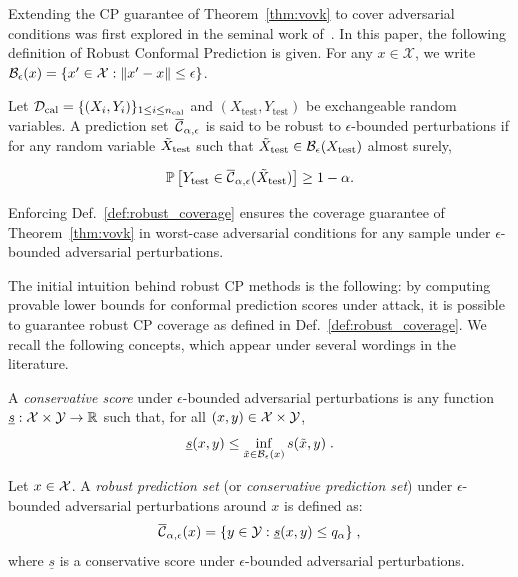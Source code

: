 Extending the CP guarantee of Theorem~\ref{thm:vovk} to cover adversarial conditions was first explored in the seminal work of~\citet{rscp}. In this paper, the following definition of Robust Conformal Prediction is given. For any $x \in \mathcal{X}$, we write $\mathcal{B}_\epsilon(x)=\{x' \in \mathcal{X}: \Vert x'-x \Vert \leq \epsilon\}$.


\begin{definition}
    Let $\mathcal{D}_\mathrm{cal} = \{ (X_i,Y_i) \}_{1 \leq i \leq n_\mathrm{cal}}$ and $(X_\mathrm{test},Y_\mathrm{test})$ be exchangeable random variables. A prediction set~$\overline{\mathcal{C}}_{\alpha, \epsilon}$ is said to be robust to $\epsilon$-bounded perturbations if for any random variable $\Tilde{X}_\mathrm{test}$ such that $\Tilde{X}_\mathrm{test} \in \mathcal{B}_\epsilon(X_\mathrm{test})$ almost surely,

    \begin{equation}
        \mathbb{P} \left[Y_\mathrm{test} \in \overline{\mathcal{C}}_{\alpha, \epsilon}(\Tilde{X}_\mathrm{test}) \right] \geq 1 - \alpha.
    \end{equation}
\label{def:robust_coverage}
\end{definition}


Enforcing Def.~\ref{def:robust_coverage} ensures the coverage guarantee of Theorem~\ref{thm:vovk} in worst-case adversarial conditions for any sample under $\epsilon$-bounded adversarial perturbations. 

The initial intuition behind robust CP methods is the following: by computing provable lower bounds for conformal prediction scores under attack, it is possible to guarantee robust CP coverage as defined in Def.~\ref{def:robust_coverage}. We recall the following concepts, which appear under several wordings in the literature.

\begin{definition}
    A \emph{conservative score} under $\epsilon$-bounded adversarial perturbations is any function $\underline{s}:\mathcal{X} \times \mathcal{Y} \to \mathbb{R}$ such that, for all $(x,y) \in \mathcal{X} \times \mathcal{Y}$,
    \begin{equation}
        \underline{s}(x,y) \leq \inf_{\Tilde{x}\in\mathcal{B}_\epsilon(x)}s(\Tilde{x},y) \;.
    \label{eq:conservativepredscore}
    \end{equation}
\end{definition}

\begin{definition}
    Let $x \in \mathcal{X}$. A \emph{robust prediction set} (or \emph{conservative prediction set}) under $\epsilon$-bounded adversarial perturbations around $x$ is defined as:
    \begin{equation}
    \label{eq:defconservativeset}
        \overline{\mathcal{C}}_{\alpha, \epsilon}(x) = \{y \in \mathcal{Y}: \underline{s}(x,y) \leq q_{\alpha}\} \;,
    \end{equation}
    where $\underline{s}$ is a conservative score under $\epsilon$-bounded adversarial perturbations.
\label{def:robust_predset}
\end{definition}

